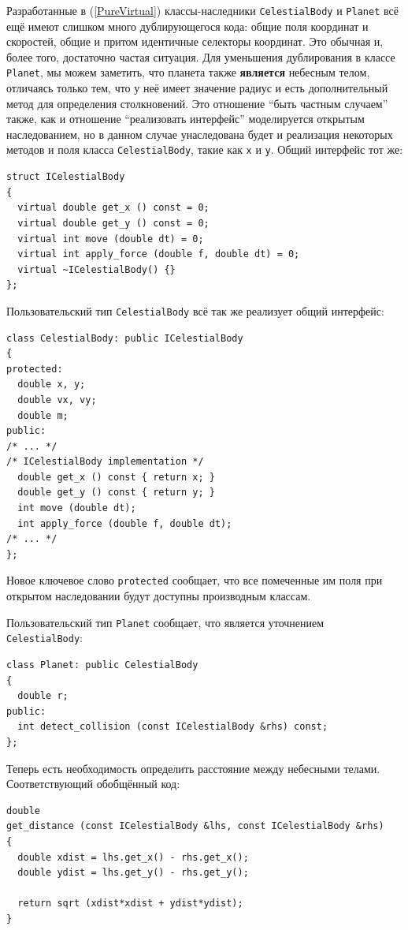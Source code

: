\documentclass[a4paper,12pt,oneside]{article}
\begin{document}
Разработанные в (\ref{PureVirtual}) классы-наследники \lstinline!CelestialBody! и \lstinline!Planet! всё ещё имеют слишком много дублирующегося кода: общие поля координат и скоростей, общие и притом идентичные селекторы координат. Это обычная и, более того, достаточно частая ситуация. Для уменьшения дублирования в классе \lstinline!Planet!, мы можем заметить, что планета также \textbf{является} небесным телом, отличаясь только тем, что у неё имеет значение радиус и есть дополнительный метод для определения столкновений. Это отношение ``быть частным случаем'' также, как и отношение ``реализовать интерфейс'' моделируется открытым наследованием, но в данном случае унаследована будет и реализация некоторых методов и поля класса \lstinline!CelestialBody!, такие как \lstinline!x! и \lstinline!y!. Общий интерфейс тот же:

\begin{lstlisting}
struct ICelestialBody
{
  virtual double get_x () const = 0;
  virtual double get_y () const = 0;
  virtual int move (double dt) = 0;
  virtual int apply_force (double f, double dt) = 0;
  virtual ~ICelestialBody() {}
};
\end{lstlisting}

Пользовательский тип \lstinline!CelestialBody! всё так же реализует общий интерфейс:

\begin{lstlisting}
class CelestialBody: public ICelestialBody
{
protected:
  double x, y;
  double vx, vy;
  double m;
public:
/* ... */
/* ICelestialBody implementation */
  double get_x () const { return x; }
  double get_y () const { return y; }
  int move (double dt); 
  int apply_force (double f, double dt);
/* ... */
};
\end{lstlisting}

Новое ключевое слово \lstinline!protected! сообщает, что все помеченные им поля при открытом наследовании будут доступны производным классам.

Пользовательский тип \lstinline!Planet! сообщает, что является уточнением \lstinline!CelestialBody!:

\begin{lstlisting}
class Planet: public CelestialBody
{
  double r;
public:
  int detect_collision (const ICelestialBody &rhs) const;
};
\end{lstlisting}

Теперь есть необходимость определить расстояние между небесными телами. Соответствующий обобщённый код:

\begin{lstlisting}
double 
get_distance (const ICelestialBody &lhs, const ICelestialBody &rhs)
{
  double xdist = lhs.get_x() - rhs.get_x();
  double ydist = lhs.get_y() - rhs.get_y();

  return sqrt (xdist*xdist + ydist*ydist);
}
\end{lstlisting}
\end{document}
